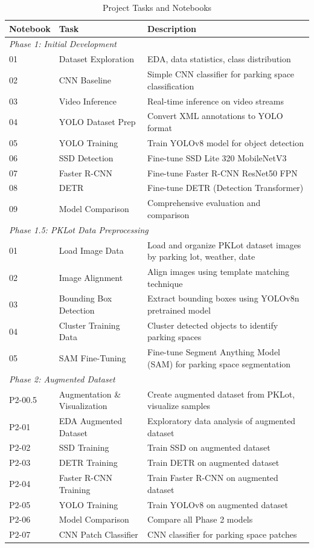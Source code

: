 \documentclass[12pt,a4paper]{article}
\begin{document}
\begin{table}[H]
\centering
\caption{Project Tasks and Notebooks}
\label{tab:tasks}
\begin{tabular}{@{}lll@{}}
\toprule
\textbf{Notebook} & \textbf{Task} & \textbf{Description} \\
\midrule
\multicolumn{3}{l}{\textit{Phase 1: Initial Development}} \\
\midrule
01 & Dataset Exploration & EDA, data statistics, class distribution \\
02 & CNN Baseline & Simple CNN classifier for parking space classification \\
03 & Video Inference & Real-time inference on video streams \\
04 & YOLO Dataset Prep & Convert XML annotations to YOLO format \\
05 & YOLO Training & Train YOLOv8 model for object detection \\
06 & SSD Detection & Fine-tune SSD Lite 320 MobileNetV3 \\
07 & Faster R-CNN & Fine-tune Faster R-CNN ResNet50 FPN \\
08 & DETR & Fine-tune DETR (Detection Transformer) \\
09 & Model Comparison & Comprehensive evaluation and comparison \\
\midrule
\multicolumn{3}{l}{\textit{Phase 1.5: PKLot Data Preprocessing}} \\
\midrule
01 & Load Image Data & Load and organize PKLot dataset images by parking lot, weather, date \\
02 & Image Alignment & Align images using template matching technique \\
03 & Bounding Box Detection & Extract bounding boxes using YOLOv8n pretrained model \\
04 & Cluster Training Data & Cluster detected objects to identify parking spaces \\
05 & SAM Fine-Tuning & Fine-tune Segment Anything Model (SAM) for parking space segmentation \\
\midrule
\multicolumn{3}{l}{\textit{Phase 2: Augmented Dataset}} \\
\midrule
P2-00.5 & Augmentation \& Visualization & Create augmented dataset from PKLot, visualize samples \\
P2-01 & EDA Augmented Dataset & Exploratory data analysis of augmented dataset \\
P2-02 & SSD Training & Train SSD on augmented dataset \\
P2-03 & DETR Training & Train DETR on augmented dataset \\
P2-04 & Faster R-CNN Training & Train Faster R-CNN on augmented dataset \\
P2-05 & YOLO Training & Train YOLOv8 on augmented dataset \\
P2-06 & Model Comparison & Compare all Phase 2 models \\
P2-07 & CNN Patch Classifier & CNN classifier for parking space patches \\
\bottomrule
\end{tabular}
\end{table}
\end{document}
